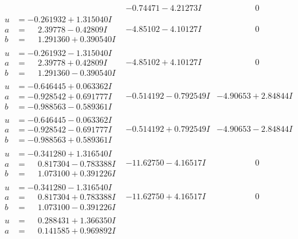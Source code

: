 \documentclass[1p]{elsarticle_modified}
\theoremstyle{definition}
\begin{document}
$$\begin{array}{c|c|c}
 & -0.74471 - 4.21273 I & \phantom{-0.000000 } 0 \\ \hline\begin{aligned}
u &= -0.261932 + 1.315040 I \\
a &= \phantom{-}2.39778 - 0.42809 I \\
b &= \phantom{-}1.291360 + 0.390540 I\end{aligned}
 & -4.85102 - 4.10127 I & \phantom{-0.000000 } 0 \\ \hline\begin{aligned}
u &= -0.261932 - 1.315040 I \\
a &= \phantom{-}2.39778 + 0.42809 I \\
b &= \phantom{-}1.291360 - 0.390540 I\end{aligned}
 & -4.85102 + 4.10127 I & \phantom{-0.000000 } 0 \\ \hline\begin{aligned}
u &= -0.646445 + 0.063362 I \\
a &= -0.928542 + 0.691777 I \\
b &= -0.988563 - 0.589361 I\end{aligned}
 & -0.514192 - 0.792549 I & -4.90653 + 2.84844 I \\ \hline\begin{aligned}
u &= -0.646445 - 0.063362 I \\
a &= -0.928542 - 0.691777 I \\
b &= -0.988563 + 0.589361 I\end{aligned}
 & -0.514192 + 0.792549 I & -4.90653 - 2.84844 I \\ \hline\begin{aligned}
u &= -0.341280 + 1.316540 I \\
a &= \phantom{-}0.817304 - 0.783388 I \\
b &= \phantom{-}1.073100 + 0.391226 I\end{aligned}
 & -11.62750 - 4.16517 I & \phantom{-0.000000 } 0 \\ \hline\begin{aligned}
u &= -0.341280 - 1.316540 I \\
a &= \phantom{-}0.817304 + 0.783388 I \\
b &= \phantom{-}1.073100 - 0.391226 I\end{aligned}
 & -11.62750 + 4.16517 I & \phantom{-0.000000 } 0 \\ \hline\begin{aligned}
u &= \phantom{-}0.288431 + 1.366350 I \\
a &= \phantom{-}0.141585 + 0.969892 I \\

\end{aligned}
\end{array}$$
\end{document}

